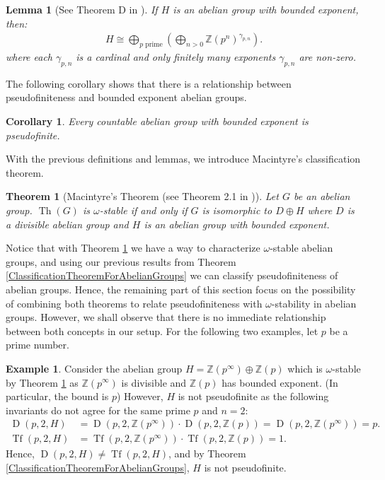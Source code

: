 \documentclass[11pt]{amsart}
\newtheorem{lema}[prop]{Lemma}
\newtheorem{teor}[prop]{Theorem}
\newtheorem{corol}[prop]{Corollary}
\theoremstyle{definition}
\newtheorem{ejem}[prop]{Example}
\newcommand{\bej}{\begin{ejem}}
\newcommand{\eej}{\end{ejem}}
\newcommand{\bl}{\begin{lema}}
\newcommand{\el}{\end{lema}}
\newcommand{\bc}{\begin{corol}}
\newcommand{\ec}{\end{corol}}
\newcommand{\bt}{\begin{teor}}
\newcommand{\et}{\end{teor}}
\begin{document}
\bl[See Theorem D in \cite{Macintyre1971}] If $H$ is an abelian group with bounded exponent, then:
\begin{align*}
    H \cong \bigoplus\limits_{p \text{ prime}}\left(\bigoplus\limits_{n>0} \mathbb{Z}(p^{n})^{\gamma_{p,n}}\right).
\end{align*}
where each $\gamma_{p,n}$ is a cardinal and only finitely many exponents $\gamma_{p,n}$ are non-zero.
\label{IsomorAbelExponenteAcotado}
\el 
The following corollary shows that there is a relationship between pseudofiniteness and bounded exponent abelian groups.
\bc Every countable abelian group with bounded exponent is pseudofinite. 
\ec 
With the previous definitions and lemmas, we introduce Macintyre's classification theorem.
\bt[Macintyre's Theorem (see Theorem 2.1 in \cite{Macintyre1971})] Let $G$ be an abelian group. $\operatorname{Th}(G)$ is $\omega$-stable if and only if $G$ is isomorphic to $D\oplus H$ where $D$ is a divisible abelian group and $H$ is an abelian group with bounded exponent. 
\label{TeoremaMacintyre2.0}
\et
Notice that with Theorem \ref{TeoremaMacintyre2.0} we have a way to characterize $\omega$-stable abelian groups, and using our previous results from Theorem \ref{ClassificationTheoremForAbelianGroups} we can classify pseudofiniteness of abelian groups. Hence, the remaining part of this section focus on the possibility of combining both theorems to relate pseudofiniteness with $\omega$-stability in abelian groups. However, we shall observe that there is no immediate relationship between both concepts in our setup. For the following two examples, let $p$ be a prime number.
\bej Consider the abelian group $H=\mathbb{Z}(p^{\infty})\oplus \mathbb{Z}(p)$ which is $\omega$-stable by Theorem \ref{TeoremaMacintyre2.0} as $\mathbb{Z}(p^{\infty})$ is divisible and $\mathbb{Z}(p)$ has bounded exponent. (In particular, the bound is $p$) However, $H$ is not pseudofinite as the following invariants do not agree for the same prime $p$ and $n=2$:
\begin{align*}
    \operatorname{D}(p,2,H) &= \operatorname{D}(p,2,\mathbb{Z}(p^{\infty}))\cdot\operatorname{D}(p,2,\mathbb{Z}(p)) = \operatorname{D}(p,2,\mathbb{Z}(p^{\infty})) = p.\\
    \operatorname{Tf}(p,2,H) &= \operatorname{Tf}(p,2,\mathbb{Z}(p^{\infty}))\cdot\operatorname{Tf}(p,2,\mathbb{Z}(p)) = 1.
\end{align*}
Hence, $\operatorname{D}(p,2,H)\neq\operatorname{Tf}(p,2,H)$, and by Theorem \ref{ClassificationTheoremForAbelianGroups}, $H$ is not pseudofinite.
\eej
\end{document}

